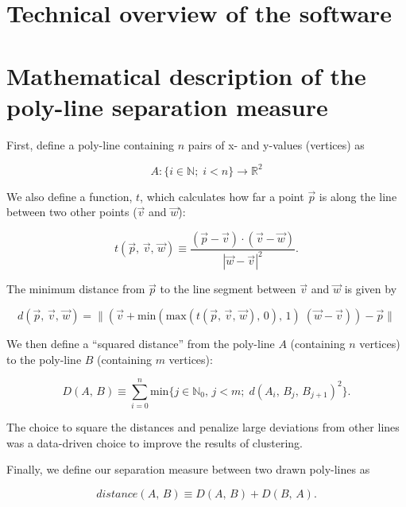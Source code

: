 \documentclass[../main.tex]{subfiles}
\begin{document}
\section{Technical overview of the software}

\section{Mathematical description of the poly-line separation measure}
\label{appendix:clusteringMaths}

First, define a poly-line containing $n$ pairs of x- and y-values (vertices) as

\begin{equation}
A: \{i \in \mathbb{N};\;i<n\} \longrightarrow \mathbb{R}
^2\end{equation}

We also define a function, $t$, which calculates how far a point $\vec{p}$ is along the line between two other points ($\vec{v}$ and $\vec{w}$):

\begin{equation}
t(\vec{p},\,\vec{v},\,\vec{w}) \equiv \frac{(\vec{p} - \vec{v})\cdot(\vec{v} - \vec{w})}{|\vec{w} - \vec{v}|^2}.
\end{equation}

The minimum distance from $\vec{p}$ to the line segment between $\vec{v}$ and $\vec{w}$ is given by

\begin{equation}
d(\vec{p},\,\vec{v},\,\vec{w}) = \|\left(\vec{v} + \mathrm{min}(\mathrm{max}(t(\vec{p},\,\vec{v},\,\vec{w}),\, 0),\, 1)\;(\vec{w} - \vec{v})\right) - \vec{p}\|
\end{equation}

We then define a ``squared distance'' from the poly-line $A$ (containing $n$ vertices) to the poly-line $B$ (containing $m$ vertices):

\begin{equation}
D(A,\,B) \equiv \sum_{i = 0}^{n} \mathrm{min}\{j \in \mathbb{N}_0,\, j < m;\; d(A_i,\, B_j,\, B_{j+1})^2\}.
\end{equation}

The choice to square the distances and penalize large deviations from other lines was a data-driven choice to improve the results of clustering.

Finally, we define our separation measure between two drawn poly-lines as

\begin{equation}
distance(A,\,B) \equiv D(A,\,B) + D(B,\,A).
\end{equation}
\end{document}
